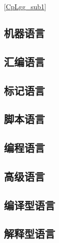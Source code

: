 
\autoref{CpLgg_sub1} 

\subsection{机器语言}\label{CpLgg_sub1}

\subsection{汇编语言}

\subsection{标记语言}

\subsection{脚本语言}

\subsection{编程语言}

\subsection{高级语言}

\subsection{编译型语言}

\subsection{解释型语言}
